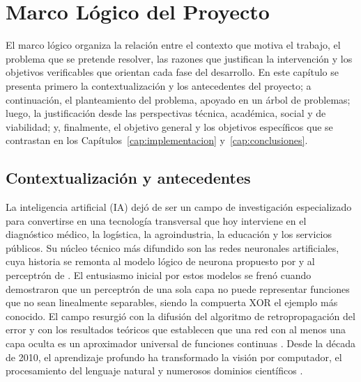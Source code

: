 \chapter{Marco Lógico del Proyecto}\label{cap:marco-logico}
El marco lógico organiza la relación entre el contexto que motiva el trabajo, el problema que se pretende resolver, las razones que justifican la intervención y los objetivos verificables que orientan cada fase del desarrollo. En este capítulo se presenta primero la contextualización y los antecedentes del proyecto; a continuación, el planteamiento del problema, apoyado en un árbol de problemas; luego, la justificación desde las perspectivas técnica, académica, social y de viabilidad; y, finalmente, el objetivo general y los objetivos específicos que se contrastan en los Capítulos~\ref{cap:implementacion} y~\ref{cap:conclusiones}.

\section{Contextualización y antecedentes}\label{sec:contexto}
La inteligencia artificial (IA) dejó de ser un campo de investigación especializado para convertirse en una tecnología transversal que hoy interviene en el diagnóstico médico, la logística, la agroindustria, la educación y los servicios públicos. Su núcleo técnico más difundido son las redes neuronales artificiales, cuya historia se remonta al modelo lógico de neurona propuesto por \citet{mcculloch1943} y al perceptrón de \citet{rosenblatt1958}. El entusiasmo inicial por estos modelos se frenó cuando \citet{minsky1969} demostraron que un perceptrón de una sola capa no puede representar funciones que no sean linealmente separables, siendo la compuerta XOR el ejemplo más conocido. El campo resurgió con la difusión del algoritmo de retropropagación del error \citep{rumelhart1986} y con los resultados teóricos que establecen que una red con al menos una capa oculta es un aproximador universal de funciones continuas \citep{cybenko1989,hornik1989}. Desde la década de 2010, el aprendizaje profundo ha transformado la visión por computador, el procesamiento del lenguaje natural y numerosos dominios científicos \citep{lecun2015,goodfellow2016,russell2021}.

